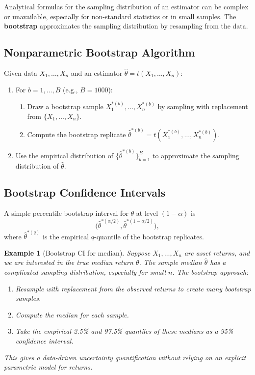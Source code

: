 \documentclass[11pt,a4paper]{article}
\newtheorem{example}{Example}[section]
\begin{document}
Analytical formulas for the sampling distribution of an estimator can be complex or unavailable, especially for non-standard statistics or in small samples. 
The \textbf{bootstrap} approximates the sampling distribution by resampling from the data.

\subsection{Nonparametric Bootstrap Algorithm}

Given data $X_1,\dots,X_n$ and an estimator $\hat{\theta} = t(X_1,\dots,X_n)$:
\begin{enumerate}
    \item For $b=1,\dots,B$ (e.g., $B=1000$):
    \begin{enumerate}
        \item Draw a bootstrap sample $X_1^{*(b)},\dots,X_n^{*(b)}$ by sampling with replacement from $\{X_1,\dots,X_n\}$.
        \item Compute the bootstrap replicate $\hat{\theta}^{*(b)} = t(X_1^{*(b)},\dots,X_n^{*(b)})$.
    \end{enumerate}
    \item Use the empirical distribution of $\{\hat{\theta}^{*(b)}\}_{b=1}^B$ to approximate the sampling distribution of $\hat{\theta}$.
\end{enumerate}

\subsection{Bootstrap Confidence Intervals}

A simple percentile bootstrap interval for $\theta$ at level $(1-\alpha)$ is
\[
\Big(\hat{\theta}^{*(\alpha/2)}, \hat{\theta}^{*(1-\alpha/2)}\Big),
\]
where $\hat{\theta}^{*(q)}$ is the empirical $q$-quantile of the bootstrap replicates.

\begin{example}[Bootstrap CI for median]
Suppose $X_1,\dots,X_n$ are asset returns, and we are interested in the true median return $\theta$. 
The sample median $\hat{\theta}$ has a complicated sampling distribution, especially for small $n$. 
The bootstrap approach:
\begin{enumerate}
    \item Resample with replacement from the observed returns to create many bootstrap samples.
    \item Compute the median for each sample.
    \item Take the empirical 2.5\% and 97.5\% quantiles of these medians as a 95\% confidence interval.
\end{enumerate}
This gives a data-driven uncertainty quantification without relying on an explicit parametric model for returns.

\end{example}
\end{document}
